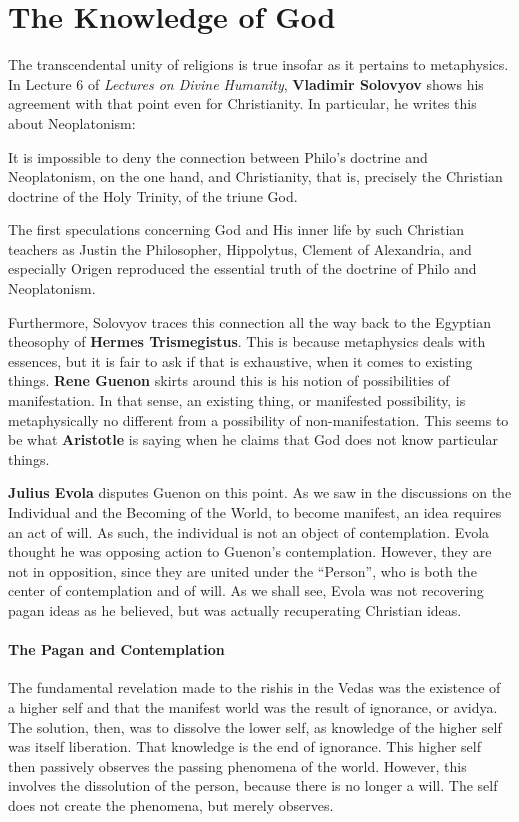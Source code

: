 \section{The Knowledge of God}

The transcendental unity of religions is true insofar as it pertains to metaphysics. In Lecture 6 of \emph{Lectures on Divine Humanity}, \textbf{Vladimir Solovyov} shows his agreement with that point even for Christianity. In particular, he writes this about Neoplatonism:

\begin{quotationx}
It is impossible to deny the connection between Philo's doctrine and Neoplatonism, on the one hand, and Christianity, that is, precisely the Christian doctrine of the Holy Trinity, of the triune God.

The first speculations concerning God and His inner life by such Christian teachers as Justin the Philosopher, Hippolytus, Clement of Alexandria, and especially Origen reproduced the essential truth of the doctrine of Philo and Neoplatonism. 

\end{quotationx}
Furthermore, Solovyov traces this connection all the way back to the Egyptian theosophy of \textbf{Hermes Trismegistus}. This is because metaphysics deals with essences, but it is fair to ask if that is exhaustive, when it comes to existing things. \textbf{Rene Guenon} skirts around this is his notion of possibilities of manifestation. In that sense, an existing thing, or manifested possibility, is metaphysically no different from a possibility of non-manifestation. This seems to be what \textbf{Aristotle} is saying when he claims that God does not know particular things.

\textbf{Julius Evola} disputes Guenon on this point. As we saw in the discussions on the Individual and the Becoming of the World, to become manifest, an idea requires an act of will. As such, the individual is not an object of contemplation. Evola thought he was opposing action to Guenon's contemplation. However, they are not in opposition, since they are united under the “Person”, who is both the center of contemplation and of will. As we shall see, Evola was not recovering pagan ideas as he believed, but was actually recuperating Christian ideas.

\paragraph{The Pagan and Contemplation}
The fundamental revelation made to the rishis in the Vedas was the existence of a higher self and that the manifest world was the result of ignorance, or avidya. The solution, then, was to dissolve the lower self, as knowledge of the higher self was itself liberation. That knowledge is the end of ignorance. This higher self then passively observes the passing phenomena of the world. However, this involves the dissolution of the person, because there is no longer a will. The self does not create the phenomena, but merely observes.

